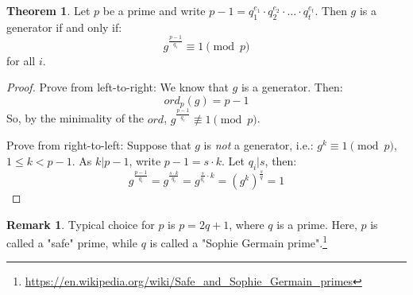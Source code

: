 \documentclass[11pt]{article}
\theoremstyle{definition}
\newtheorem{theorem}{Theorem}[section]
\newtheorem{remark}{Remark}[section]
\theoremstyle{proof}
\begin{document}
	\begin{theorem}
		Let $p$ be a prime and write $p-1 = q_1^{e_1} \cdot q_2^{e_2} \cdot \dots \cdot q_t^{e_t}$.
		Then $g$ is a generator if and only if:
		$$
		g^{\frac{p-1}{q_i}} \equiv 1 \pmod{p}
		$$
		for all $i$.
	\end{theorem}
	
	\begin{proof}
		Prove from left-to-right: We know that $g$ is a generator. Then:
		$$
		ord_p(g) = p-1
		$$
		So, by the minimality of the $ord$, $g^{\frac{p-1}{q_i}} \not\equiv 1 \pmod{p}$.
		
		Prove from right-to-left: Suppose that $g$ is \emph{not} a generator, i.e.: $g^k \equiv 1 \pmod{p}$, $1 \le k < p-1$.
		As $k | p-1$, write $p-1 = s \cdot k$.
		Let $q_i | s$, then:
		$$
		g^{\frac{p-1}{q_i}} = g^{\frac{s \cdot k}{q_i}} = g^{\frac{s}{q_i} \cdot k} = (g^k)^{\frac{s}{q}} = 1
		$$
	\end{proof}
	
	\begin{remark}
		Typical choice for $p$ is $p = 2q + 1$, where $q$ is a prime. Here, $p$ is called a "safe" prime, while $q$ is called a "Sophie Germain prime".\footnote{\url{https://en.wikipedia.org/wiki/Safe_and_Sophie_Germain_primes}}
	\end{remark}
	
\end{document}
